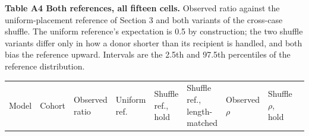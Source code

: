 \begin{minipage}{\linewidth}
\textbf{Table A4 \textbar{} Both references, all fifteen cells.} Observed ratio against the
uniform-placement reference of Section 3 and both variants of the
cross-case shuffle. The uniform reference's expectation is 0.5 by construction; the two shuffle
variants differ only in how a donor shorter than its recipient is handled, and both bias
the reference upward. Intervals are the 2.5th and 97.5th percentiles of the reference distribution.

\vspace{0.5em}
\centering\footnotesize
\begin{tabular}{@{}
  >{\raggedright\arraybackslash}p{}
  >{\raggedright\arraybackslash}p{}
  >{\raggedleft\arraybackslash}p{}
  >{\raggedright\arraybackslash}p{}
  >{\raggedright\arraybackslash}p{}
  >{\raggedright\arraybackslash}p{}
  >{\raggedleft\arraybackslash}p{}
  >{\raggedright\arraybackslash}p{}
  >{\raggedright\arraybackslash}p{}@{}}
\toprule\noalign{}
\begin{minipage}[b]{\linewidth}\raggedright
Model
\end{minipage} & \begin{minipage}[b]{\linewidth}\raggedright
Cohort
\end{minipage} & \begin{minipage}[b]{\linewidth}\raggedleft
Observed ratio
\end{minipage} & \begin{minipage}[b]{\linewidth}\raggedright
Uniform ref.
\end{minipage} & \begin{minipage}[b]{\linewidth}\raggedright
Shuffle ref., hold
\end{minipage} & \begin{minipage}[b]{\linewidth}\raggedright
Shuffle ref., length-matched
\end{minipage} & \begin{minipage}[b]{\linewidth}\raggedleft
Observed $\rho$
\end{minipage} & \begin{minipage}[b]{\linewidth}\raggedright
Shuffle $\rho$, hold

\end{minipage}
\end{tabular}
\end{minipage}
